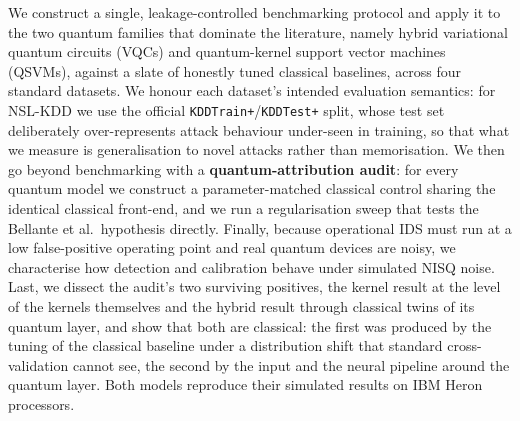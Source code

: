 \documentclass[preprint,11pt]{elsarticle}
\begin{document}
We construct a single, leakage-controlled benchmarking protocol and apply it to the two
quantum families that dominate the literature, namely hybrid variational quantum circuits (VQCs)
and quantum-kernel support vector machines (QSVMs), against a slate of honestly tuned
classical baselines, across four standard datasets. We honour each dataset's intended
evaluation semantics: for NSL-KDD we use the official \texttt{KDDTrain+}/\texttt{KDDTest+}
split, whose test set deliberately over-represents attack behaviour under-seen in training,
so that what we measure is generalisation to novel attacks rather than memorisation. We then
go beyond benchmarking with a \textbf{quantum-attribution audit}: for every quantum model we
construct a parameter-matched classical control sharing the identical classical front-end, and
we run a regularisation sweep that tests the Bellante et al.\ hypothesis directly. Finally,
because operational IDS must run at a low false-positive operating point and real quantum
devices are noisy, we characterise how detection and calibration behave under simulated NISQ
noise. Last, we dissect the audit's two surviving positives, the kernel result at the level of the kernels
themselves and the hybrid result through classical twins of its quantum layer, and show that both are
classical: the first was produced by the tuning of the classical baseline under a distribution shift that
standard cross-validation cannot see, the second by the input and the neural pipeline around the quantum
layer. Both models reproduce their simulated results on IBM Heron processors.
\end{document}
